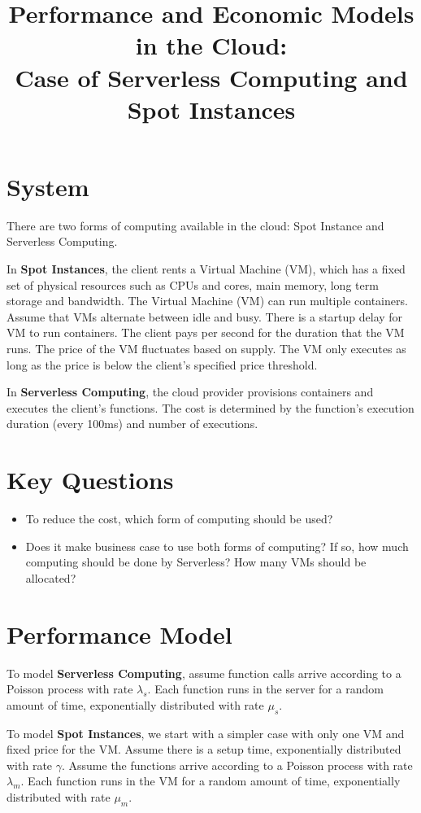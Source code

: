 \documentclass[letter,11pt]{article}
\title{Performance and Economic Models in the Cloud:\\
Case of Serverless Computing and Spot Instances}
\date{}
\begin{document}
\maketitle

\section{System}

There are two forms of computing available in the cloud: Spot Instance and Serverless Computing.

In \textbf{Spot Instances}, the client rents a Virtual Machine (VM), which has a fixed set of physical resources such as CPUs and cores, main memory, long term storage and bandwidth. The Virtual Machine (VM) can run multiple containers. Assume that VMs alternate between idle and busy. There is a startup delay for VM to run containers.
The client pays per second for the duration that the VM runs. The price of the VM fluctuates based on supply. The VM only executes as long as the price is below the client's specified price threshold.

In \textbf{Serverless Computing}, the cloud provider provisions containers and executes the client's functions. The cost is determined by the function's execution duration (every 100ms) and number of executions.  

\section{Key Questions}
\begin{itemize}
\item
To reduce the cost, which form of computing should be used?
\item
Does it make business case to use both forms of computing? If so, how much computing should be done by Serverless? How many VMs should be allocated?
\end{itemize}

\section{Performance Model}

To model \textbf{Serverless Computing}, assume function calls arrive according to a Poisson process with rate $\lambda_s$. Each function runs in the server for a random amount of time, exponentially distributed with rate $\mu_s$. 

To model \textbf{Spot Instances}, we start with a simpler case with only one VM and fixed price for the VM. Assume there is a setup time, exponentially distributed with rate $\gamma$. Assume the functions arrive according to a Poisson process with rate $\lambda_m$. Each function runs in the VM for a random amount of time, exponentially distributed with rate $\mu_m$. 
\end{document}

